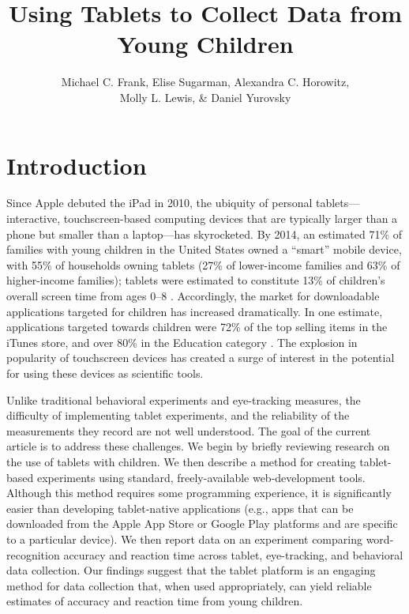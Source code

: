 \documentclass[man,noapacite]{apa2}
\title{Using Tablets to Collect Data from Young Children}
\author{Michael C. Frank, Elise Sugarman, Alexandra C. Horowitz, \\ Molly L. Lewis, \& Daniel Yurovsky}
\affiliation{Department of Psychology, Stanford University}
\begin{document}
\maketitle


\section{Introduction}

Since Apple debuted the iPad in 2010, the ubiquity of personal tablets---interactive, touchscreen-based computing devices that are typically larger than a phone but smaller than a laptop---has skyrocketed. 
By 2014, an estimated 71\% of families with young children in the United States owned a ``smart'' mobile device, with 55\% of households owning tablets (27\% of lower-income families and 63\% of higher-income families); tablets were estimated to constitute 13\% of children's overall screen time from ages 0--8 \cite{rideout2014}.
Accordingly, the market for downloadable applications targeted for children has increased dramatically. In one estimate, applications targeted towards children were 72\% of the top selling items in the iTunes store, and over 80\% in the Education category \cite{shuler2012}. The explosion in popularity of touchscreen devices has created a surge of interest in the potential for using these devices as scientific tools. 

Unlike traditional behavioral experiments and eye-tracking measures, the difficulty of implementing tablet experiments, and the reliability of the measurements they record are not well understood. The goal of the current article is to address these challenges. We begin by briefly reviewing research on the use of tablets with children. We then describe a method for creating tablet-based experiments using standard, freely-available web-development tools. Although this method requires some programming experience, it is significantly easier than developing tablet-native applications (e.g., apps that can be downloaded from the Apple App Store or Google Play platforms and are specific to a particular device). We then report data on an experiment comparing word-recognition accuracy and reaction time across tablet, eye-tracking, and behavioral data collection. Our findings suggest that the tablet platform is an engaging method for data collection that, when used appropriately, can yield reliable estimates of accuracy and reaction time from young children. 
\end{document}
